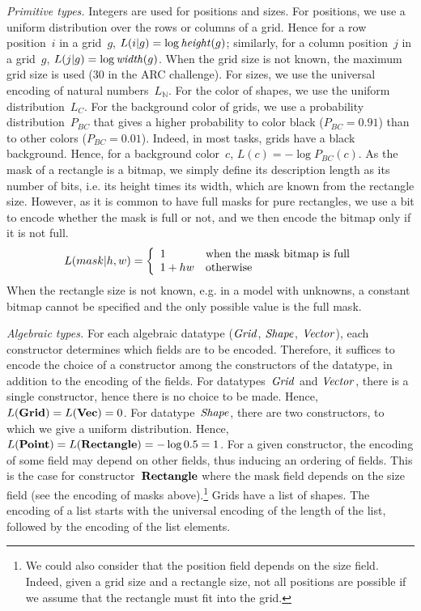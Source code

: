 \documentclass[a4paper]{llncs}
\newcommand{\KILL}[1]{}
\newcommand{\nat}{\mathbb{N}}
\begin{document}
{\em Primitive types.} Integers are used for positions and sizes. For
positions, we use a uniform distribution over the rows or columns of a
grid. Hence for a row position~$i$ in a grid~$g$,
$L(i|g) = \log {\it height}(g)$; similarly, for a column position~$j$
in a grid~$g$, $L(j|g) = \log {\it width}(g)$. When the grid size is
not known, the maximum grid size is used (30 in the ARC challenge).
%
For sizes, we use the universal encoding of natural numbers~$L_\nat$.
%
For the color of shapes, we use the uniform distribution~$L_C$. For
the background color of grids, we use a probability
distribution~$P_{BC}$ that gives a higher probability to color black
($P_{BC} = 0.91$) than to other colors ($P_{BC} = 0.01$). Indeed, in
most tasks, grids have a black background. Hence, for a background
color~$c$, $L(c) = -\log P_{BC}(c)$. \KILL{We then define the
  description length of background colors $L_{BC}(c)$ as
  $L_{P_{bc}}(c)$.}
%
As the mask of a rectangle is a bitmap, we simply define its
description length as its number of bits, i.e. its height times its
width, which are known from the rectangle size. However, as it is
common to have full masks for pure rectangles, we use a bit to encode
whether the mask is full or not, and we then encode the bitmap only if
it is not full.
\[ L(mask|h,w) = \left\{
  \begin{array}{l@{\quad}l}
    1 & \textrm{when the mask bitmap is full} \\
    1 + hw & \textrm{otherwise} \\
  \end{array}\right. \]
When the rectangle size is not known, e.g. in a model with unknowns, a
constant bitmap cannot be specified and the only possible value is the
full mask.

{\em Algebraic types.} For each algebraic datatype (${\it Grid}$,
${\it Shape}$, ${\it Vector}$), each constructor determines which
fields are to be encoded. Therefore, it suffices to encode the choice
of a constructor among the constructors of the datatype, in addition
to the encoding of the fields. For datatypes~${\it Grid}$ and
${\it Vector}$, there is a single constructor, hence there is no
choice to be made. Hence, $L({\bf Grid}) = L({\bf Vec}) = 0$. For
datatype~${\it Shape}$, there are two constructors, to which we give a
uniform distribution. Hence,
$L({\bf Point}) = L({\bf Rectangle}) = -\log 0.5 = 1$.
%
For a given constructor, the encoding of some field may depend on
other fields, thus inducing an ordering of fields. This is the case
for constructor~${\bf Rectangle}$ where the mask field depends on the
size field (see the encoding of masks above).\footnote{We could also consider
that the position field depends on the size field. Indeed, given a
grid size and a rectangle size, not all positions are possible if we
assume that the rectangle must fit into the grid.}
%
Grids have a list of shapes. The encoding of a list starts with the
universal encoding of the length of the list, followed by the encoding
of the list elements.
\end{document}

